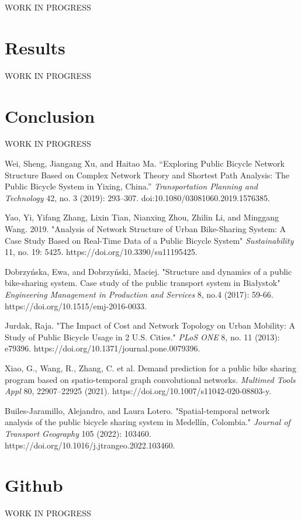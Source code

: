 \documentclass[conference]{IEEEtran}
\begin{document}
WORK IN PROGRESS

\section{Results}

WORK IN PROGRESS

\section{Conclusion}

WORK IN PROGRESS

\begin{thebibliography}{1}

Wei, Sheng, Jiangang Xu, and Haitao Ma. “Exploring Public Bicycle Network Structure Based on Complex Network Theory and Shortest Path Analysis: The Public Bicycle System in Yixing, China.” \textit{Transportation Planning and Technology} 42, no. 3 (2019): 293–307. doi:10.1080/03081060.2019.1576385.

Yao, Yi, Yifang Zhang, Lixin Tian, Nianxing Zhou, Zhilin Li, and Minggang Wang. 2019. "Analysis of Network Structure of Urban Bike-Sharing System: A Case Study Based on Real-Time Data of a Public Bicycle System" \textit{Sustainability} 11, no. 19: 5425. https://doi.org/10.3390/su11195425.

Dobrzyńska, Ewa, and Dobrzyński, Maciej. "Structure and dynamics of a public bike-sharing system. Case study of the public transport system in Białystok" \textit{Engineering Management in Production and Services} 8, no.4 (2017): 59-66. https://doi.org/10.1515/emj-2016-0033.

Jurdak, Raja. "The Impact of Cost and Network Topology on Urban Mobility: A Study of Public Bicycle Usage in 2 U.S. Cities." \textit{PLoS ONE} 8, no. 11 (2013): e79396. https://doi.org/10.1371/journal.pone.0079396.

Xiao, G., Wang, R., Zhang, C. et al. Demand prediction for a public bike sharing program based on spatio-temporal graph convolutional networks. \textit{Multimed Tools Appl} 80, 22907–22925 (2021). https://doi.org/10.1007/s11042-020-08803-y.

Builes-Jaramillo, Alejandro, and Laura Lotero. "Spatial-temporal network analysis of the public bicycle sharing system in Medellín, Colombia." \textit{Journal of Transport Geography} 105 (2022): 103460. https://doi.org/10.1016/j.jtrangeo.2022.103460.

\end{thebibliography}

\section{Github}

WORK IN PROGRESS
\end{document}

